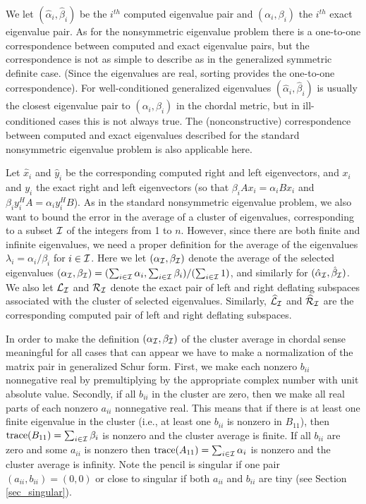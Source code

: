 We let $({\hat{\alpha}}_i, {\hat{\beta}}_i)$ be the $i^{th}$ computed
eigenvalue pair and $({\alpha}_i, {\beta}_i)$ the $i^{th}$ exact eigenvalue
pair.
As for the nonsymmetric eigenvalue problem there is a
one-to-one correspondence between computed and exact eigenvalue pairs,
but the correspondence is not as simple to describe as in the generalized
symmetric definite case. (Since the eigenvalues are real, sorting provides
the one-to-one correspondence). For well-conditioned generalized eigenvalues
$({\hat{\alpha}}_i, {\hat{\beta}}_i)$ is usually the closest eigenvalue pair
to $({\alpha}_i, {\beta}_i)$ in the chordal metric,
but in ill-conditioned cases this is not always true. 
The (nonconstructive) correspondence between computed and exact
eigenvalues described 
for the standard nonsymmetric eigenvalue problem is also applicable here.

Let $\hat{x}_i$ and $\hat{y}_i$ be the corresponding computed right
and left eigenvectors, and $x_i$ and $y_i$ the exact right and left
eigenvectors (so that ${\beta}_i A x_i = {\alpha}_i B x_i$ and
${\beta}_i y_i^H A  = {\alpha}_i y_i^H B$).
As in the standard nonsymmetric eigenvalue problem, we also want to
bound the error in the average of a cluster of eigenvalues, corresponding
to a subset $\cal I$ of the integers from 1 to $n$.
However, since there are both finite and infinite eigenvalues,
we need a proper definition for the average of the eigenvalues
${\lambda}_i = {\alpha}_i/{\beta}_i$ for $i \in {\cal I}$.
Here we let $( {\alpha}_{\cal I}, {\beta}_{\cal I} )$
denote the average of the selected eigenvalues
$( {\alpha}_{\cal I}, {\beta}_{\cal I} ) =
  (\sum_{i \in {\cal I}} {\alpha}_i, \sum_{i \in {\cal I}} {\beta}_i )/
  (\sum_{i \in {\cal I}} 1)$, and similarly for
$( \hat{{\alpha}}_{\cal I}, \hat{{\beta}}_{\cal I} )$.
We also let ${\cal L}_{\cal I}$ and ${\cal R}_{\cal I}$ denote the
exact pair of left
and right deflating subspaces associated with the cluster of selected
eigenvalues.
Similarly, $\widehat{{\cal L}}_{\cal I}$ and
$\widehat{{\cal R}}_{\cal I}$ are the
corresponding computed pair of left and right deflating subspaces.

In order to make
the definition $( {\alpha}_{\cal I}, {\beta}_{\cal I} )$
of the cluster average in chordal sense meaningful
for all cases that can appear we have to make a normalization of the
matrix pair in generalized Schur form.
First, we make each nonzero $b_{ii}$ nonnegative real
by premultiplying by the appropriate complex number with unit absolute value.
Secondly, if all $b_{ii}$ in the cluster are zero, then
we make all real parts of each nonzero $a_{ii}$ nonnegative real.
This means that if there is at least one finite eigenvalue in the
cluster (i.e., at least one $b_{ii}$ is nonzero in $B_{11}$), then
${\rm trace}(B_{11}) = \sum_{i \in {\cal I}} {\beta}_i$ is nonzero and
the cluster average is finite.
If all $b_{ii}$ are zero and some $a_{ii}$ is nonzero then
${\rm trace}(A_{11}) = \sum_{i \in {\cal I}} {\alpha}_i$ is nonzero
and the cluster average is infinity.
Note the pencil is singular if one pair $(a_{ii}, b_{ii}) = (0,0)$
or close to singular if both $a_{ii}$ and $b_{ii}$ are tiny
(see Section \ref{sec_singular}).

